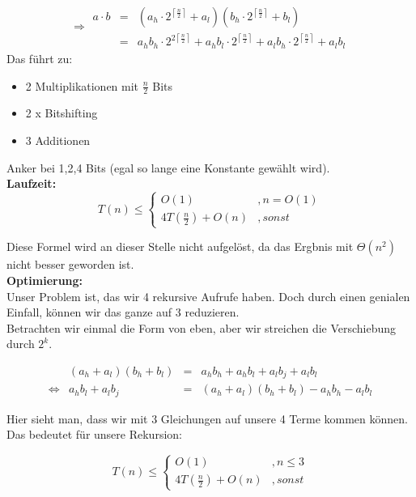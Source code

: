 $$
\Rightarrow \begin{array}{rcl}
a \cdot b &=& \left( a_h \cdot 2^{\left\lceil \frac{n}{2} \right\rceil} + a_l \right) \left( b_h \cdot 2^{\left\lceil \frac{n}{2} \right\rceil} + b_l \right)\\
&=& a_hb_h \cdot 2^{2 \left\lceil \frac{n}{2} \right\rceil} + a_hb_l \cdot 2^{\left\lceil \frac{n}{2} \right\rceil}+ a_lb_h \cdot 2^{\left\lceil \frac{n}{2} \right\rceil} + a_lb_l
\end{array}
$$
Das führt zu:
\begin{itemize}
\item 2 Multiplikationen mit $\frac{n}{2}$ Bits
\item 2 x Bitshifting
\item 3 Additionen
\end{itemize}
Anker bei 1,2,4 Bits (egal so lange eine Konstante gewählt wird).\\

\textbf{Laufzeit:}
$$
T(n) \leq \left\{ \begin{array}{lr}
O(1) &, n = O(1)\\
4 T(\frac{n}{2}) + O(n) &, sonst
\end{array} \right.
$$

Diese Formel wird an dieser Stelle nicht aufgelöst, da das Ergbnis mit $\Theta (n^2)$ nicht besser geworden ist.\\

\textbf{Optimierung:}\\

Unser Problem ist, das wir 4 rekursive Aufrufe haben. Doch durch einen genialen Einfall, können wir das ganze auf 3 reduzieren.\\

Betrachten wir einmal die Form von eben, aber wir streichen die Verschiebung durch $2^k$.

$$
\begin{array}{crcl}
&\left( a_h + a_l \right) \left( b_h + b_l \right) &=& a_hb_h + a_hb_l + a_lb_j + a_lb_l\\
\Leftrightarrow& a_hb_l + a_lb_j &=& \left( a_h + a_l \right) \left( b_h + b_l \right) - a_hb_h - a_lb_l
\end{array}
$$

Hier sieht man, dass wir mit 3 Gleichungen auf unsere 4 Terme kommen können. Das bedeutet für unsere Rekursion:

$$
T(n) \leq \left\{ \begin{array}{lr}
O(1) &, n \leq 3\\
4 T(\frac{n}{2}) + O(n) &, sonst
\end{array} \right.
$$

